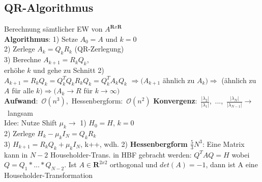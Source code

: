 \subsection{QR-Algorithmus}
Berechnung sämtlicher EW von $A^{\mathbf{R}x\mathbf{R}}$\\
\textbf{Algorithmus}: 1) Setze $A_0 = A$ und $k = 0$\\
2) Zerlege $A_k = Q_kR_k$ (QR-Zerlegung)\\
3) Berechne $A_{k+1} = R_kQ_k$, \\
\hspace*{4mm}erhöhe $k$ und gehe zu Schnitt 2)\\
$A_{k+1} = R_kQ_k = Q_k^TQ_kR_kQ_k = Q_k^TA_kQ_k$
$\Rightarrow (A_{k+1}$ ähnlich zu $A_k) \Rightarrow$ (ähnlich zu $A$ für alle $k) \Rightarrow (A_k \rightarrow R$ für $k \rightarrow \infty)$\\
\mbox{\textbf{Aufwand}: $\mathcal{O}(n^3)$, Hessenbergform: $\mathcal{O}(n^2)$}
\mbox{\textbf{Konvergenz}: $\frac{|\lambda_2|}{|\lambda_1|}$, ...,  $\frac{|\lambda_N|}{|\lambda_{N-1}|} \rightarrow$ langsam}\\
Idee: Nutze Shift $\mu_k \rightarrow$ 1) $H_0 = H$, $k = 0$\\
2) Zerlege $H_k - \mu_kI_N = Q_kR_k$\\
3) $H_{k+1} = R_kQ_k + \mu_kI_N$, k++, wdh. 2)
\textbf{Hessenbergform $\frac{5}{3}N^3$}: Eine Matrix kann in $N-2$ Householder-Trans. in HBF gebracht werden: $Q^TAQ = H$ wobei $Q = Q_1 * ... * Q_{N-2}$. Ist $A \in \mathbf{R}^{2x2}$ orthogonal und $det(A) = -1$, dann ist A eine Householder-Transformation